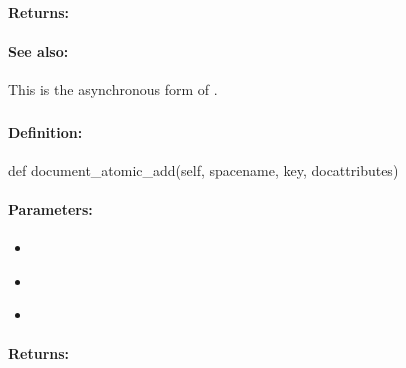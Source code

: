 \paragraph{Returns:}


\paragraph{See also:}  This is the asynchronous form of .

\pagebreak
\subsubsection{}
\label{api:python:document_atomic_add}


\paragraph{Definition:}
\begin{pythoncode}
def document_atomic_add(self, spacename, key, docattributes)
\end{pythoncode}

\paragraph{Parameters:}
\begin{itemize}[noitemsep]
\item {}\\

\item {}\\

\item {}\\

\end{itemize}

\paragraph{Returns:}


\pagebreak
\subsubsection{}
\label{api:python:async_document_atomic_add}


